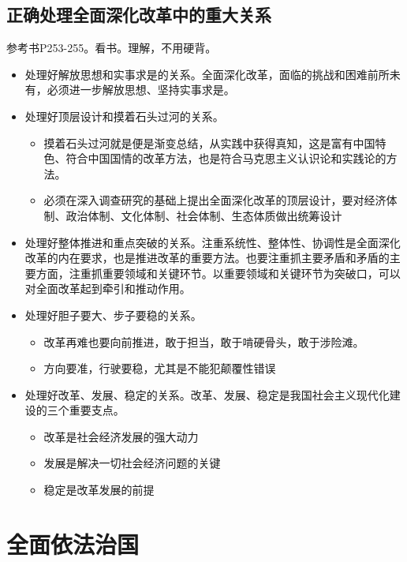     \subsection{正确处理全面深化改革中的重大关系}
        参考书P253-255。看书。理解，不用硬背。
        \begin{itemize}
            \item 处理好解放思想和实事求是的关系。全面深化改革，面临的挑战和困难前所未有，必须进一步解放思想、坚持实事求是。
            \item 处理好顶层设计和摸着石头过河的关系。
            \begin{itemize}
                \item 摸着石头过河就是便是渐变总结，从实践中获得真知，这是富有中国特色、符合中国国情的改革方法，也是符合马克思主义认识论和实践论的方法。
                \item 必须在深入调查研究的基础上提出全面深化改革的顶层设计，要对经济体制、政治体制、文化体制、社会体制、生态体质做出统筹设计
            \end{itemize}
            \item 处理好整体推进和重点突破的关系。注重系统性、整体性、协调性是全面深化改革的内在要求，也是推进改革的重要方法。也要注重抓主要矛盾和矛盾的主要方面，注重抓重要领域和关键环节。以重要领域和关键环节为突破口，可以对全面改革起到牵引和推动作用。
            \item 处理好胆子要大、步子要稳的关系。
            \begin{itemize}
                \item 改革再难也要向前推进，敢于担当，敢于啃硬骨头，敢于涉险滩。
                \item 方向要准，行驶要稳，尤其是不能犯颠覆性错误
            \end{itemize}
            \item 处理好改革、发展、稳定的关系。改革、发展、稳定是我国社会主义现代化建设的三个重要支点。
            \begin{itemize}
                \item 改革是社会经济发展的强大动力
                \item 发展是解决一切社会经济问题的关键
                \item 稳定是改革发展的前提
            \end{itemize}
        \end{itemize}


\section{全面依法治国}
